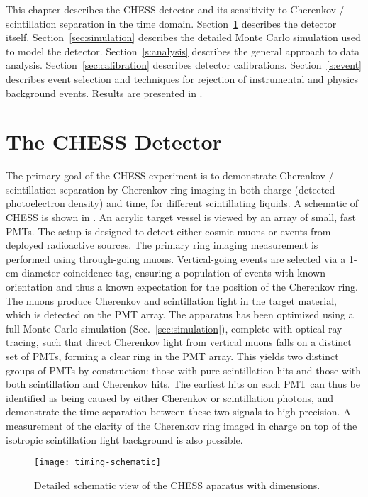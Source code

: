 This chapter describes the CHESS detector and its sensitivity to Cherenkov / scintillation separation in  the time domain.  Section~\ref{s:desc} describes the detector itself.  Section~\ref{sec:simulation} describes the detailed Monte Carlo simulation used to model the detector. 
Section~\ref{s:analysis} describes the general approach to data analysis.  Section~\ref{sec:calibration} describes detector calibrations.  Section~\ref{s:event} describes event selection and techniques for rejection of instrumental and physics background events.
Results are presented in .


\section{The CHESS Detector}\label{s:desc}

The primary goal of the CHESS experiment is to demonstrate Cherenkov / scintillation  separation by Cherenkov ring imaging in both charge (detected photoelectron density) and time, for different scintillating liquids.  
A schematic of CHESS is shown in .  An acrylic target vessel is viewed by an array of small, fast PMTs. 
The setup is designed to detect either cosmic muons or events from deployed radioactive sources.  The primary ring imaging measurement is performed using through-going muons.  Vertical-going events are selected via a 1-cm diameter coincidence tag, ensuring a population of events with known orientation and thus a known expectation for the position of the Cherenkov ring. 
The muons produce Cherenkov and scintillation light in the target material, which is detected on the PMT array. The apparatus has been optimized using a full Monte Carlo simulation (Sec.~\ref{sec:simulation}), complete with optical ray tracing, such that direct Cherenkov light from vertical muons falls on a distinct set of PMTs, forming a clear ring in the PMT array.  This yields two distinct groups of PMTs by construction: those with pure scintillation hits and those with both scintillation and Cherenkov hits. The earliest hits on each PMT can thus be identified as being caused by either Cherenkov or scintillation photons, and demonstrate the time separation between these two signals to high precision. 
A  measurement of the clarity of the Cherenkov ring imaged in charge on top of the isotropic scintillation light background is also possible.

\begin{figure}
\centering
\texttt{[image: timing-schematic]}
\caption{Detailed schematic view of the CHESS aparatus with dimensions.}
\label{fig:timing-setup}
\end{figure}


